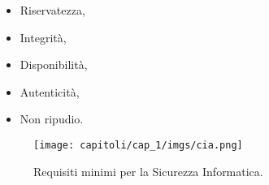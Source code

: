 \begin{itemize}
      \item Riservatezza,
      \item Integrità,
      \item Disponibilità,
      \item Autenticità,
      \item Non ripudio.
\end{itemize}

\begin{figure}[H]
      \centering
      \texttt{[image: capitoli/cap\_1/imgs/cia.png]}
      \caption{Requisiti minimi per la Sicurezza Informatica.}
\end{figure}